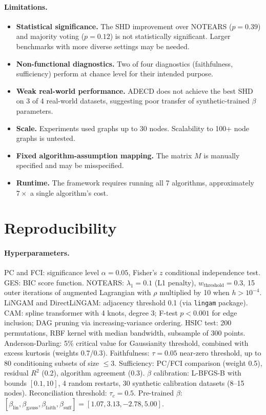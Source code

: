 \documentclass{article}
\newcommand{\adecd}{\textsc{ADECD}}
\begin{document}
\paragraph{Limitations.}
\begin{itemize}
    \item \textbf{Statistical significance.} The SHD improvement over NOTEARS ($p = 0.39$) and majority voting ($p = 0.12$) is not statistically significant. Larger benchmarks with more diverse settings may be needed.
    \item \textbf{Non-functional diagnostics.} Two of four diagnostics (faithfulness, sufficiency) perform at chance level for their intended purpose.
    \item \textbf{Weak real-world performance.} \adecd{} does not achieve the best SHD on 3 of 4 real-world datasets, suggesting poor transfer of synthetic-trained $\beta$ parameters.
    \item \textbf{Scale.} Experiments used graphs up to 30 nodes. Scalability to 100+ node graphs is untested.
    \item \textbf{Fixed algorithm-assumption mapping.} The matrix $M$ is manually specified and may be misspecified.
    \item \textbf{Runtime.} The framework requires running all 7 algorithms, approximately $7\times$ a single algorithm's cost.
\end{itemize}

\section{Reproducibility}
\label{sec:reproducibility}

\paragraph{Hyperparameters.}
PC and FCI: significance level $\alpha = 0.05$, Fisher's $z$ conditional independence test.
GES: BIC score function.
NOTEARS: $\lambda_1 = 0.1$ (L1 penalty), $w_{\mathrm{threshold}} = 0.3$, 15 outer iterations of augmented Lagrangian with $\rho$ multiplied by 10 when $h > 10^{-4}$.
LiNGAM and DirectLiNGAM: adjacency threshold 0.1 (via \texttt{lingam} package).
CAM: spline transformer with 4 knots, degree 3; F-test $p < 0.001$ for edge inclusion; DAG pruning via increasing-variance ordering.
HSIC test: 200 permutations, RBF kernel with median bandwidth, subsample of 300 points.
Anderson-Darling: 5\% critical value for Gaussianity threshold, combined with excess kurtosis (weights 0.7/0.3).
Faithfulness: $\tau = 0.05$ near-zero threshold, up to 80 conditioning subsets of size $\leq 3$.
Sufficiency: PC/FCI comparison (weight 0.5), residual $R^2$ (0.2), algorithm agreement (0.3).
$\beta$ calibration: L-BFGS-B with bounds $[0.1, 10]$, 4 random restarts, 30 synthetic calibration datasets (8--15 nodes).
Reconciliation threshold: $\tau_c = 0.5$.
Pre-trained $\beta$: $[\beta_{\mathrm{lin}}, \beta_{\mathrm{gauss}}, \beta_{\mathrm{faith}}, \beta_{\mathrm{suff}}] = [1.07, 3.13, -2.78, 5.00]$.
\end{document}
